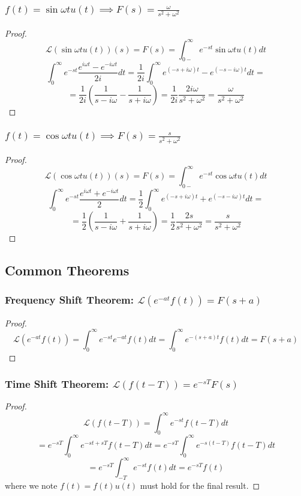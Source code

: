 \documentclass[11pt]{article}
\begin{document}
\subsubsection{$f(t) =  \sin \omega t u(t) \implies F(s)  = \frac{\omega}{s^2 + \omega^2}$}
\begin{proof}

\[\mathcal{L}(\sin \omega t u(t))(s) = F(s) = \int_{0-}^{\infty} e^{-st}\sin \omega tu(t)  dt \]
\[\int_0^{\infty} e^{-st} \frac{e^{i\omega t} - e^{-i\omega t}}{2i} dt = \frac{1}{2i} \int_0^{\infty}  e^{(-s + i \omega)t} - e^{(-s - i\omega)t} dt = \]
\[= \frac{1}{2i} (\frac{1}{s - i \omega} - \frac{1}{s + i \omega}) = \frac{1}{2i} \frac{2i \omega}{s^2 + \omega^2}= \frac{\omega}{s^2 + \omega^2}\]
	
\end{proof}


\subsubsection{$f(t) = \cos \omega t u(t) \implies F(s)  = \frac{s}{s^2 + \omega^2}$}
\begin{proof}

\[\mathcal{L}(\cos \omega t u(t))(s) = F(s) = \int_{0-}^{\infty} e^{-st}\cos \omega tu(t)  dt \]
\[\int_0^{\infty} e^{-st} \frac{e^{i\omega t} + e^{-i\omega t}}{2} dt = \frac{1}{2} \int_0^{\infty}  e^{(-s + i \omega)t} + e^{(-s - i\omega)t} dt = \]
\[= \frac{1}{2} (\frac{1}{s - i \omega} + \frac{1}{s + i \omega}) = \frac{1}{2} \frac{2s}{s^2 + \omega^2}= \frac{s}{s^2 + \omega^2}\]
	
\end{proof}

\subsection{Common Theorems}
\subsubsection{Frequency Shift Theorem: $\mathcal{L}(e^{-at}f(t)) = F(s + a)$}
\begin{proof}
	\[\mathcal{L}(e^{-at}f(t)) = \int_0^{\infty} e^{-st}e^{-at}f(t) dt = \int_0^{\infty} e^{-(s + a)t}f(t) dt = F(s + a)\]
\end{proof}

\subsubsection{Time Shift Theorem: $\mathcal{L}(f(t - T)) = e^{-sT}F(s)$}
\begin{proof}
	\[\mathcal{L}(f(t - T)) = \int_0^{\infty} e^{-st} f(t - T) dt
\] 
	\[ = e^{-sT}\int_{0}^{\infty}e^{-st + sT} f(t - T) dt =e^{-sT}\int_{0}^{\infty}e^{-s(t - T)} f(t - T) dt\]
	\[=e^{-sT}\int_{-T}^{\infty}e^{-st} f(t) dt = e^{-sT}f(t)\] where we note $f(t) = f(t)u(t)$ must hold for the final result. 
\end{proof}
\end{document}
